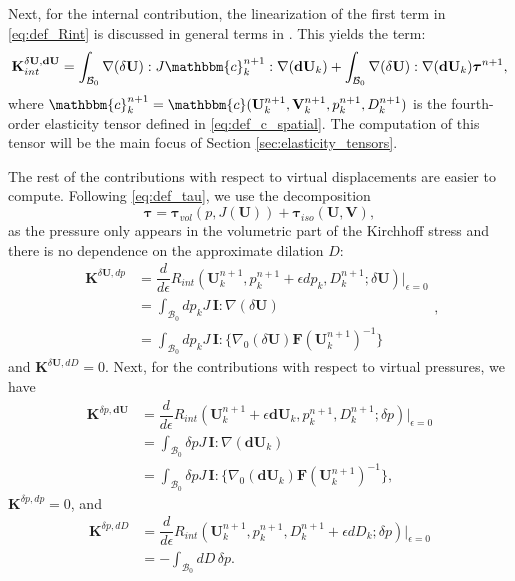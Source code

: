 \documentclass{sfuthesis}
\numberwithin{equation}{section}
\numberwithin{figure}{chapter}
\numberwithin{table}{chapter}
\theoremstyle{definition}
\def\*#1{{\mathbf{#1}}} %
\newcommand{\der}[2]{\dfrac{d #1}{d #2}}
\newcommand{\B}{\mathcal{B}}
\renewcommand{\c}{\mathbbm{c}}
\def\btau{{\bm{\tau}}}
\begin{document}
Next, for the internal contribution, the linearization of the first term in \eqref{eq:def_Rint} is discussed in general terms in \cite[Chapter 8]{HolzapfelBook}. This yields the term:
\begin{equation} \label{eq:def_K_int_11}
    \*K_{int}^{\delta \*U, \*d \*U} = \int_{\B_0} \nabla (\delta \*U) : J\c^{n+1}_k : \nabla(\*d\*U_k) + \int_{\B_0} \nabla(\delta \*U) : \nabla (\*d\*U_k) \btau^{n+1},
\end{equation}
where $\c^{n+1}_k = \c(\*U^{n+1}_k, \*V^{n+1}_k, p^{n+1}_k, D^{n+1}_k)$ is the fourth-order elasticity tensor defined in \eqref{eq:def_c_spatial}. The computation of this tensor will be the main focus of Section \ref{sec:elasticity_tensors}.

The rest of the contributions with respect to virtual displacements are easier to compute. Following \eqref{eq:def_tau}, we use the decomposition 
\begin{equation}
    \btau = \btau_{vol}(p,J(\*U)) + \btau_{iso}(\*U,\*V),
\end{equation}
as the pressure only appears in the volumetric part of the Kirchhoff stress and there is no dependence on the approximate dilation $D$:
\begin{equation}
\begin{aligned}
\*K^{\delta \*U, dp} &= \der{}{\epsilon} R_{int}(\*U^{n+1}_k, p^{n+1}_k + \epsilon dp_k, D^{n+1}_k; \delta\*U) \Big|_{\epsilon=0} \\
&= \int_{\B_0} dp_k J \, \*I : \nabla(\delta\*U) \\
&= \int_{\B_0} dp_k J \, \*I : \Big\{ \nabla_0(\delta\*U) \*F(\*U^{n+1}_k)^{-1} \Big\}
\end{aligned},
\end{equation}
and $\*K^{\delta\*U, dD} = 0$. Next, for the contributions with respect to virtual pressures, we have
\begin{equation}
\begin{aligned}
\*K^{\delta p, \*d\*U} &= \der{}{\epsilon} R_{int}(\*U^{n+1}_k + \epsilon \*d\*U_k, p^{n+1}_k, D^{n+1}_k ; \delta p) \Big|_{\epsilon=0} \\
&= \int_{\B_0} \delta p J \, \*I : \nabla (\*d\*U_k) \\
&= \int_{\B_0} \delta p J \, \*I : \Big\{ \nabla_0 (\*d\*U_k) \*F(\*U^{n+1}_k)^{-1} \Big\},
\end{aligned}
\end{equation}
$\*K^{\delta p, dp} = 0$, and
\begin{equation}
\begin{aligned}
\*K^{\delta p, dD} &= \der{}{\epsilon}R_{int}(\*U^{n+1}_k, p^{n+1}_k, D^{n+1}_k + \epsilon dD_k ; \delta p) \Big|_{\epsilon=0} \\
&= - \int_{\B_0} dD \, \delta p.
\end{aligned}
\end{equation}
\end{document}
